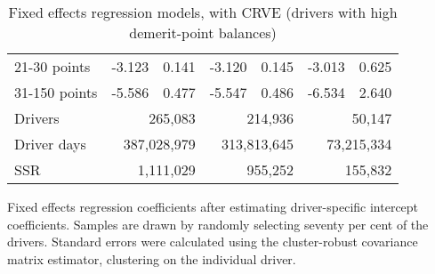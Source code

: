 \begin{table}
\begin{tabular}{l r r r r r r}
21-30 points  & -3.123  &  0.141  & -3.120  &  0.145  & -3.013  &  0.625   \\ 
 
31-150 points  & -5.586  &  0.477  & -5.547  &  0.486  & -6.534  &  2.640   \\ 
 

\hline 
 

Drivers 
 & \multicolumn{2}{r}{265,083}  & \multicolumn{2}{r}{214,936}  & \multicolumn{2}{r}{50,147}   \\ 
 

Driver days 
 & \multicolumn{2}{r}{387,028,979}  & \multicolumn{2}{r}{313,813,645}  & \multicolumn{2}{r}{73,215,334}   \\ 
 

SSR 
 & \multicolumn{2}{r}{1,111,029}  & \multicolumn{2}{r}{955,252}  & \multicolumn{2}{r}{155,832}   \\ 
 

\hline 
 
\end{tabular} 
\caption{Fixed effects regression models, with CRVE (drivers with high demerit-point balances)} 
Fixed effects regression coefficients after estimating driver-specific intercept coefficients. 
Samples are drawn by randomly selecting seventy per cent of the drivers. 
Standard errors were calculated using the cluster-robust covariance matrix estimator, 
clustering on the individual driver. 
\label{tab:FE_regs_CRVE_high_pts} 
\end{table} 
 
